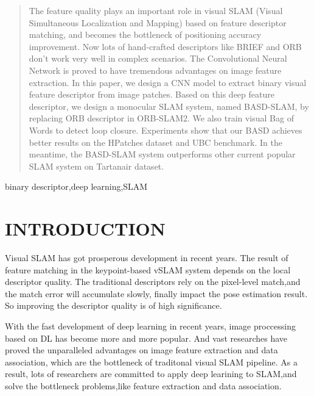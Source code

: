 \documentclass[conference]{IEEEtran}
\begin{document}
\begin{abstract}
The feature quality plays an important role in visual SLAM (Visual Simultaneous Localization and Mapping) based on feature descriptor matching, and becomes the bottleneck of positioning accuracy improvement. Now lots of hand-crafted descriptors like BRIEF and ORB don't work very well in complex scenarios. The Convolutional Neural Network is proved to have tremendous advantages on image feature extraction. In this paper, we design a CNN model to extract binary visual feature descriptor from image patches. Based on this deep feature descriptor, we design a monocular SLAM system, named BASD-SLAM, by replacing ORB descriptor in ORB-SLAM2. We also train visual Bag of Words to detect loop closure. Experiments show that our BASD achieves better results on the HPatches dataset and UBC benchmark. In the meantime, the BASD-SLAM system outperforms other current popular SLAM system on Tartanair dataset.


\end{abstract}

\begin{IEEEkeywords}
binary descriptor,deep learning,SLAM
\end{IEEEkeywords}




\section{INTRODUCTION}

Visual SLAM has got prosperous development in recent years. The result of feature matching in the keypoint-based vSLAM system depends on the local descriptor quality. The traditional descriptors rely on the pixel-level match,and the match error will accumulate slowly, finally impact the pose estimation result. So improving the descriptor quality is of high significance.

With the fast development of deep learning in recent years,  image proccessing based on DL has become more and more popular. And vast researches have proved the unparalleled advantages on image feature extraction and data association, which are the bottleneck of traditonal visual SLAM pipeline. As a result, lots of researchers are committed to apply deep learining to SLAM,and solve the bottleneck problems,like feature extraction and data association.
\end{document}
